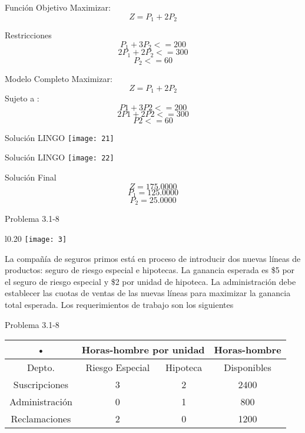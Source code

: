 \documentclass{beamer}
\begin{document}
\begin{frame}[fragile]{Función Objetivo}
Maximizar:\\
\[Z = P_{1} + 2P_{2}\]

\end{frame}

\begin{frame}[fragile]{Restricciones}
\[P_{1} + 3P_{2}  <= 200\]
\[2P_{1} + 2P_{2} <= 300\]
\[P_{2} <= 60\]
\end{frame}

\begin{frame}[fragile]{Modelo Completo}
Maximizar:\\
\[Z = P_{1} + 2P_{2}\]
Sujeto a :\\
\[P1 + 3P2  <= 200\]
\[2P1 + 2P2 <= 300\]
\[P2 <= 60\]
\end{frame}

\begin{frame}[fragile]{Solución LINGO}
    \texttt{[image: 21]}
\end{frame}
\begin{frame}[fragile]{Solución LINGO}
    \texttt{[image: 22]}
\end{frame}

\begin{frame}[fragile]{Solución Final}
\[Z = 175.0000\]
\[P_{1} = 125.0000\]
\[P_{2} = 25.0000\]
\end{frame}

\begin{frame}[t,fragile]{Problema 3.1-8 }
\begin{wrapfigure}{l}{0.20\textwidth}
    \centering
    \texttt{[image: 3]}
\end{wrapfigure} La compañía de seguros primos está en proceso de introducir dos nuevas líneas de productos: seguro de riesgo especial e hipotecas. La ganancia esperada es \$5 por el seguro de riesgo especial y \$2 por unidad de hipoteca.
La administración debe establecer las cuotas de ventas de las nuevas líneas para maximizar la ganancia total esperada. Los requerimientos de trabajo son los siguientes\\
\end{frame}
\begin{frame}[t,fragile]{Problema 3.1-8 }

\begin{tabular}{|c|c|c|c|}
\hline 
• & \multicolumn{2}{c|}{Horas-hombre por unidad} & Horas-hombre \\ 
\hline 
Depto. & Riesgo Especial & Hipoteca & Disponibles \\ 
\hline 
Suscripciones & 3 & 2 & 2400 \\ 
\hline 
Administración & 0 & 1 & 800 \\ 
\hline 
Reclamaciones & 2 & 0 & 1200 \\ 
\hline 
\end{tabular} 
\end{frame}
\end{document}

